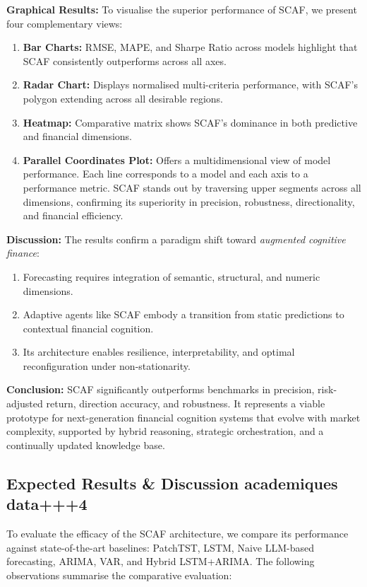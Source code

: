 \documentclass[conference]{IEEEtran}
\begin{document}
\textbf{Graphical Results:}
To visualise the superior performance of SCAF, we present four complementary views:
\begin{enumerate}
    \item \textbf{Bar Charts:} RMSE, MAPE, and Sharpe Ratio across models highlight that SCAF consistently outperforms across all axes.
    \item \textbf{Radar Chart:} Displays normalised multi-criteria performance, with SCAF's polygon extending across all desirable regions.
    \item \textbf{Heatmap:} Comparative matrix shows SCAF’s dominance in both predictive and financial dimensions.
    \item \textbf{Parallel Coordinates Plot:} Offers a multidimensional view of model performance. Each line corresponds to a model and each axis to a performance metric. SCAF stands out by traversing upper segments across all dimensions, confirming its superiority in precision, robustness, directionality, and financial efficiency.
\end{enumerate}

\textbf{Discussion:}
The results confirm a paradigm shift toward \emph{augmented cognitive finance}:
\begin{enumerate}
    \item Forecasting requires integration of semantic, structural, and numeric dimensions.
    \item Adaptive agents like SCAF embody a transition from static predictions to contextual financial cognition.
    \item Its architecture enables resilience, interpretability, and optimal reconfiguration under non-stationarity.
\end{enumerate}

\textbf{Conclusion:}
SCAF significantly outperforms benchmarks in precision, risk-adjusted return, direction accuracy, and robustness. It represents a viable prototype for next-generation financial cognition systems that evolve with market complexity, supported by hybrid reasoning, strategic orchestration, and a continually updated knowledge base.
\subsection{Expected Results & Discussion academiques data+++4}
To evaluate the efficacy of the SCAF architecture, we compare its performance against state-of-the-art baselines: PatchTST, LSTM, Naive LLM-based forecasting, ARIMA, VAR, and Hybrid LSTM+ARIMA. The following observations summarise the comparative evaluation:
\end{document}
